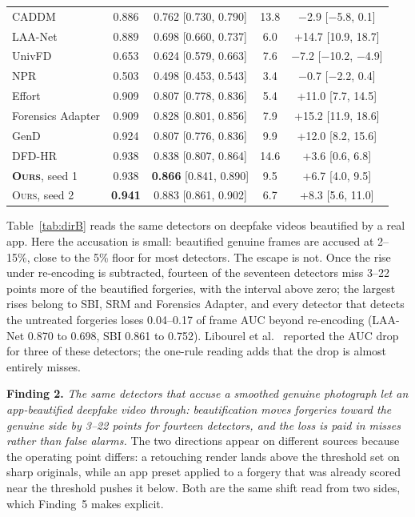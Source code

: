 \documentclass[conference]{IEEEtran}
\newcommand{\ours}{\textsc{Ours}}
\begin{document}
\begin{table}[t]
\begin{tabular}{@{}l c c c c@{}}
CADDM & 0.886 & 0.762 [0.730, 0.790] & 13.8 & $-$2.9 [$-$5.8, 0.1] \\
LAA-Net & 0.889 & 0.698 [0.660, 0.737] & 6.0 & +14.7 [10.9, 18.7] \\
UnivFD & 0.653 & 0.624 [0.579, 0.663] & 7.6 & $-$7.2 [$-$10.2, $-$4.9] \\
NPR & 0.503 & 0.498 [0.453, 0.543] & 3.4 & $-$0.7 [$-$2.2, 0.4] \\
Effort & 0.909 & 0.807 [0.778, 0.836] & 5.4 & +11.0 [7.7, 14.5] \\
Forensics Adapter & 0.909 & 0.828 [0.801, 0.856] & 7.9 & +15.2 [11.9, 18.6] \\
GenD & 0.924 & 0.807 [0.776, 0.836] & 9.9 & +12.0 [8.2, 15.6] \\
DFD-HR & 0.938 & 0.838 [0.807, 0.864] & 14.6 & +3.6 [0.6, 6.8] \\
\midrule
\textbf{\ours{}}, seed 1 & 0.938 & \textbf{0.866} [0.841, 0.890] & 9.5 & +6.7 [4.0, 9.5] \\
\ours{}, seed 2 & \textbf{0.941} & 0.883 [0.861, 0.902] & 6.7 & +8.3 [5.6, 11.0] \\
\bottomrule
\end{tabular}
\end{table}

Table~\ref{tab:dirB} reads the same detectors on deepfake videos beautified by a real app. Here the accusation is small:
beautified genuine frames are accused at 2--15\%, close to the 5\% floor for most detectors.
The escape is not. Once the rise under re-encoding is subtracted, fourteen of the seventeen detectors miss 3--22 points
more of the beautified forgeries, with the interval above zero;
the largest rises belong to SBI, SRM and Forensics Adapter, and every detector that detects the untreated forgeries loses
0.04--0.17 of frame AUC beyond re-encoding (LAA-Net 0.870 to 0.698, SBI 0.861 to 0.752).
Libourel et al.~\cite{libourel2024} reported the AUC drop for three of these detectors; the one-rule reading adds that the
drop is almost entirely misses.

\textbf{Finding 2.} \emph{The same detectors that accuse a smoothed genuine photograph let an app-beautified deepfake video
through: beautification moves forgeries toward the genuine side by 3--22 points for fourteen detectors, and the loss is paid
in misses rather than false alarms.} The two directions appear on different sources because the operating point differs: a
retouching render lands above the threshold set on sharp originals, while an app preset applied to a forgery that was already
scored near the threshold pushes it below. Both are the same shift read from two sides, which Finding~5 makes explicit.
\end{document}
